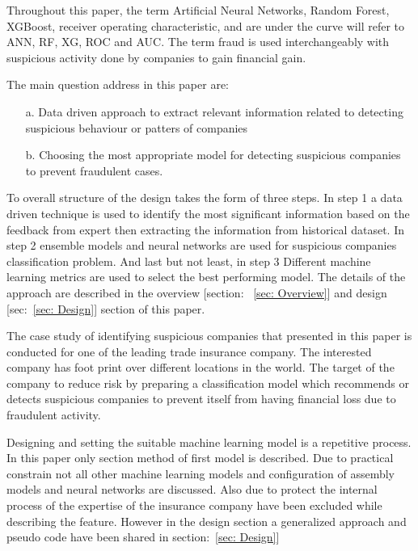 

Throughout this paper, the term Artificial Neural Networks, Random Forest, XGBoost, receiver operating characteristic, and are under the curve will refer to ANN, RF, XG, ROC and AUC. The term fraud is used interchangeably with suspicious activity done by companies to gain financial gain.



The main question address in this paper are:
\begin{itemize}
    \item[a.] Data driven approach to extract relevant information related to detecting suspicious behaviour or patters of companies
    \item[b.] Choosing the most appropriate model for detecting suspicious companies to prevent fraudulent cases.
\end{itemize}

To overall structure of the design takes the form of three steps. In step 1 a data driven technique is used to identify the most significant information based on the feedback from expert then extracting the information from historical dataset. In step 2 ensemble models and neural networks are used for suspicious companies classification problem. And last but not least, in step 3 Different machine learning metrics are used to select the best performing model. The details of the approach are described in the overview [section: ~\ref{sec: Overview}] and design [sec:~\ref{sec: Design}] section of this paper.


The case study of identifying suspicious companies that presented in this paper is conducted for one of the leading trade insurance company. The interested company has foot print over different locations in the world. The target of the company to reduce risk by preparing a classification model which recommends or detects suspicious companies to prevent itself from having financial loss due to fraudulent activity.


Designing and setting the suitable machine learning model is a repetitive process. In this paper only section method of first model is described. Due to practical constrain not all other machine learning models and configuration of assembly models and neural networks are discussed. Also due to protect the internal process of the expertise of the insurance company have been excluded while describing the feature. However in the design section a generalized approach and pseudo code have been shared in section:~\ref{sec: Design}]






